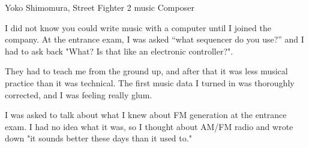 \begin{q}{Yoko Shimomura, Street Fighter 2 music Composer\cite{beep199010}}
  
I did not know you could write music with a computer until I joined the company. At the entrance exam, I was asked “what sequencer do you use?” and I had to ask back "What? Is that like an electronic controller?".

They had to teach me from the ground up, and after that it was less musical practice than it was technical. The first music data I turned in was thoroughly corrected, and I was feeling really glum.

I was asked to talk about what I knew about FM generation at the entrance exam. I had no idea what it was, so I thought about AM/FM radio and wrote down "it sounds better these days than it used to."
\end{q}


